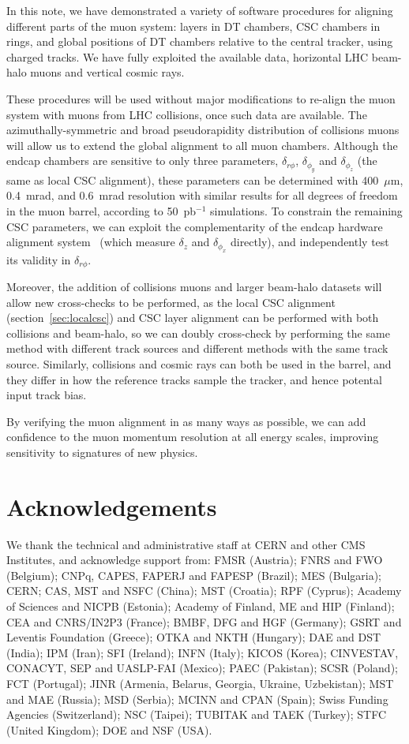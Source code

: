 In this note, we have demonstrated a variety of software procedures for
aligning different parts of the muon system: layers in DT chambers,
CSC chambers in rings, and global positions of DT chambers relative to
the central tracker, using charged tracks.  We have fully exploited the available data,
horizontal LHC beam-halo muons and vertical cosmic rays.

These procedures will be used without major modifications to re-align
the muon system with muons from LHC collisions, once such data are
available.  The azimuthally-symmetric and broad pseudorapidity
distribution of collisions muons will allow us to extend the global
alignment to all muon chambers.  Although the endcap chambers are
sensitive to only three parameters, $\delta_{r\phi}$,
$\delta_{\phi_y}$ and $\delta_{\phi_z}$ (the same as local CSC
alignment), these parameters can be determined with 400~$\mu$m,
0.4~mrad, and 0.6~mrad resolution with similar results for all degrees
of freedom in the muon barrel, according to 50~pb$^{-1}$ simulations.
To constrain the remaining CSC parameters, we can exploit the
complementarity of the endcap hardware alignment
system~\cite{ref:hardware_alignment} (which measure $\delta_z$ and
$\delta_{\phi_x}$ directly), and independently test its validity in
$\delta_{r\phi}$.

Moreover, the addition of collisions muons and larger beam-halo
datasets will allow new cross-checks to be performed, as the local CSC
alignment (section~\ref{sec:localcsc}) and CSC layer alignment can be
performed with both collisions and beam-halo, so we can doubly
cross-check by performing the same method with different track sources
and different methods with the same track source.  Similarly,
collisions and cosmic rays can both be used in the barrel, and they
differ in how the reference tracks sample the tracker, and hence
potental input track bias.

By verifying the muon alignment in as many ways as possible, we can
add confidence to the muon momentum resolution at all energy scales,
improving sensitivity to signatures of new physics.

\section{Acknowledgements}

We thank the technical and administrative staff at CERN and other 
CMS Institutes, and acknowledge support from:
FMSR (Austria); 
FNRS and FWO (Belgium); 
CNPq, CAPES, FAPERJ and FAPESP (Brazil); 
MES (Bulgaria); 
CERN; 
CAS, MST and NSFC (China); 
MST (Croatia); 
RPF (Cyprus); 
Academy of Sciences and NICPB (Estonia); 
Academy of Finland, ME and HIP (Finland); 
CEA and CNRS/IN2P3 (France); 
BMBF, DFG and HGF (Germany); 
GSRT and Leventis Foundation (Greece); 
OTKA and NKTH (Hungary); 
DAE and DST (India); 
IPM (Iran); 
SFI (Ireland); 
INFN (Italy); 
KICOS (Korea); 
CINVESTAV, CONACYT, SEP and UASLP-FAI (Mexico); 
PAEC (Pakistan); 
SCSR (Poland); 
FCT (Portugal); 
JINR (Armenia, Belarus, Georgia, Ukraine, Uzbekistan);
MST and MAE (Russia);
MSD (Serbia);
MCINN and CPAN (Spain); 
Swiss Funding Agencies (Switzerland);
NSC (Taipei); 
TUBITAK and TAEK (Turkey); 
STFC (United Kingdom); 
DOE and NSF (USA).

